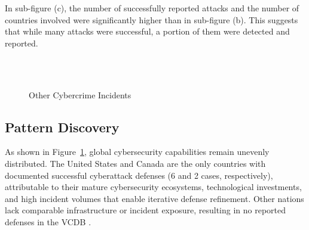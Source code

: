 	In sub-figure (c), the number of successfully reported attacks and the number of countries involved were significantly higher than in sub-figure (b).
	This suggests that while many attacks were successful, a portion of them were detected and reported.
	\begin{figure}[htbp]
		\centering
		\\
		\hfill
		\\
		\caption{Other Cybercrime Incidents}\label{fig:other-cybercrime-incidents}
	\end{figure}
\subsection{Pattern Discovery}\label{subsec:pattern-discovery} %
	As shown in Figure~\ref{fig:other-cybercrime-incidents}, global cybersecurity capabilities remain unevenly distributed.
	The United States and Canada are the only countries with documented successful cyberattack defenses (6 and 2 cases, respectively),
	attributable to their mature cybersecurity ecosystems, technological investments, and high incident volumes that enable iterative defense refinement.
	Other nations lack comparable infrastructure or incident exposure, resulting in no reported defenses in the VCDB .

